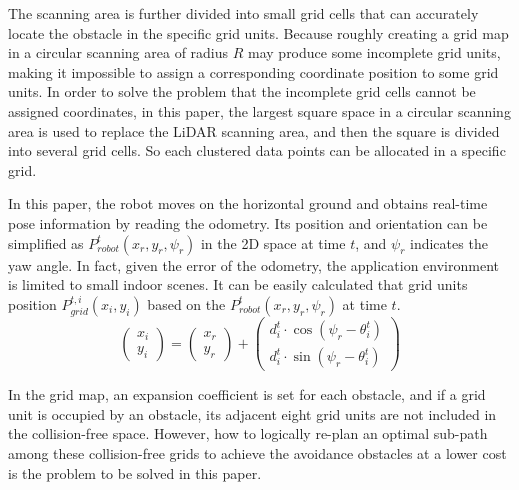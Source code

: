 \documentclass{iosart2c}
\begin{document}
The scanning area is further divided into small grid cells that can accurately locate the obstacle in the specific grid units. Because roughly creating a grid map in a circular scanning area of radius $R$ may produce some incomplete grid units, making it impossible to assign a corresponding coordinate position to some grid units. In order to solve the problem that the incomplete grid cells cannot be assigned coordinates, in this paper, the largest square space in a circular scanning area is used to replace the LiDAR scanning area, and then the square is divided into several grid cells. So each clustered data points can be allocated in a specific grid.

In this paper, the robot moves on the horizontal ground and obtains real-time pose information by reading the odometry. Its position and orientation can be simplified as $P_{robot}^{t}\left(x_{r}, y_{r}, \psi_{r}\right)$ in the 2D space at time $t$, and $\psi_{r}$ indicates the yaw angle. In fact, given the error of the odometry, the application environment is limited to small indoor scenes. It can be easily calculated that  grid units position $P_{grid}^{t, i}\left(x_{i}, y_{i}\right)$ based on the $P_{robot}^{t}\left(x_{r}, y_{r}, \psi_{r}\right)$ at time $t$. 
\setlength{\abovedisplayskip}{3pt}  %
\setlength{\belowdisplayskip}{3pt}
\begin{equation} %
\left(\begin{array}{l}
x_{i} \\
y_{i}
\end{array}\right)=\left(\begin{array}{l}
x_{r} \\
y_{r}
\end{array}\right)+\left(\begin{array}{l}
d_{i}^{t} \cdot \cos \left(\psi_{r}-\theta_{i}^{t}\right) \\
d_{i}^{t} \cdot \sin \left(\psi_{r}-\theta_{i}^{t}\right)
\end{array}\right)
\end{equation}

In the grid map, an expansion coefficient is set for each obstacle, and if a grid unit is occupied by an obstacle, its adjacent eight grid units are not included in the collision-free space. However, how to logically re-plan an optimal sub-path among these collision-free grids to achieve the avoidance obstacles at a lower cost is the problem to be solved in this paper.
\end{document}
